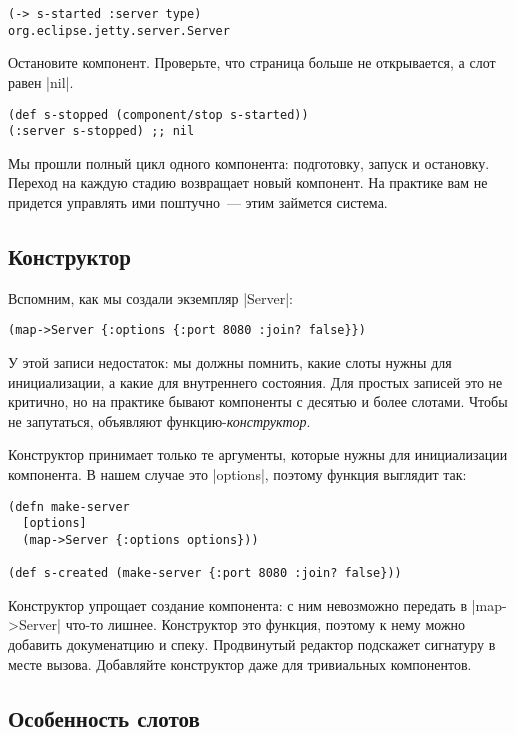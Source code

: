 \begin{verbatim}
(-> s-started :server type)
org.eclipse.jetty.server.Server
\end{verbatim}

Остановите компонент. Проверьте, что страница больше не открывается, а слот
равен \spverb|nil|.

\begin{verbatim}
(def s-stopped (component/stop s-started))
(:server s-stopped) ;; nil
\end{verbatim}

Мы прошли полный цикл одного компонента: подготовку, запуск и остановку. Переход
на каждую стадию возвращает новый компонент. На практике вам не придется
управлять ими поштучно~--- этим займется система.

\subsection{Конструктор}

Вспомним, как мы создали экземпляр \spverb|Server|:

\begin{verbatim}
(map->Server {:options {:port 8080 :join? false}})
\end{verbatim}

У этой записи недостаток: мы должны помнить, какие слоты нужны для
инициализации, а какие для внутреннего состояния. Для простых записей это не
критично, но на практике бывают компоненты с десятью и более слотами. Чтобы не
запутаться, объявляют функцию-\emph{конструктор}.

Конструктор принимает только те аргументы, которые нужны для инициализации
компонента. В нашем случае это \spverb|options|, поэтому функция выглядит так:

\begin{verbatim}
(defn make-server
  [options]
  (map->Server {:options options}))

(def s-created (make-server {:port 8080 :join? false}))
\end{verbatim}

Конструктор упрощает создание компонента: с ним невозможно передать в
\spverb|map->Server| что-то лишнее. Конструктор это функция, поэтому к нему
можно добавить докуменатцию и спеку. Продвинутый редактор подскажет сигнатуру в
месте вызова. Добавляйте конструктор даже для тривиальных компонентов.

\subsection{Особенность слотов}

